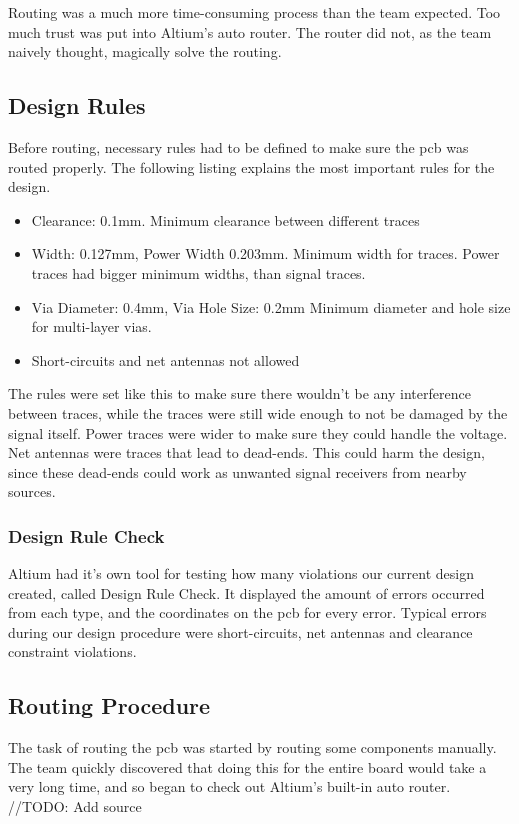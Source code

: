 Routing was a much more time-consuming process than the team expected.
Too much trust was put into Altium's auto router.
The router did not, as the team naively thought, magically solve the routing.

\subsection{Design Rules}
Before routing, necessary rules had to be defined to make sure the \gls{pcb} was routed properly.
The following listing explains the most important rules for the design.
\begin{itemize}
\item Clearance: 0.1mm.
\newline
Minimum clearance between different traces
\item Width: 0.127mm, Power Width 0.203mm.
\newline
Minimum width for traces.
Power traces had bigger minimum widths, than signal traces.
\item Via Diameter: 0.4mm, Via Hole Size: 0.2mm
\newline
Minimum diameter and hole size for multi-layer vias.
\item Short-circuits and net antennas not allowed
\end{itemize}

The rules were set like this to make sure there wouldn't be any interference between traces, while the traces were still wide enough to not be damaged by the signal itself.
Power traces were wider to make sure they could handle the voltage.
Net antennas were traces that lead to dead-ends.
This could harm the design, since these dead-ends could work as unwanted signal receivers from nearby sources.

\subsubsection{Design Rule Check}
Altium had it's own tool for testing how many violations our current design created, called Design Rule Check.
It displayed the amount of errors occurred from each type, and the coordinates on the \gls{pcb} for every error.
Typical errors during our design procedure were short-circuits, net antennas and clearance constraint violations.

\subsection{Routing Procedure}
The task of routing the \gls{pcb} was started by routing some components manually.
The team quickly discovered that doing this for the entire board would take a very long time, and so began to check out Altium's built-in auto router.
//TODO: Add source

